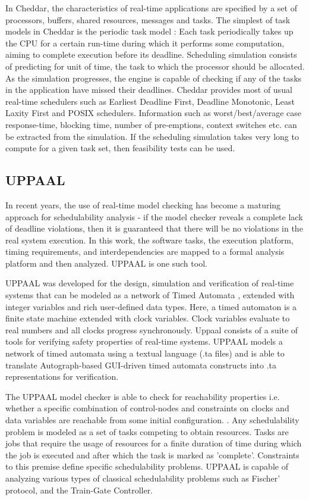 In Cheddar, the characteristics of real-time applications are specified by a set of processors, buffers, shared resources, messages and tasks. The simplest of task models in Cheddar is the periodic task model \cite{liu1973scheduling}: Each task periodically takes up the CPU for a certain run-time during which it performs some computation, aiming to complete execution before its deadline. Scheduling simulation consists of predicting for unit of time, the task to which the processor should be allocated. As the simulation progresses, the engine is capable of checking if any of the tasks in the application have missed their deadlines. Cheddar provides most of usual real-time schedulers such as Earliest Deadline First, Deadline Monotonic, Least Laxity First and POSIX schedulers. Information such as worst/best/average case response-time, blocking time, number of pre-emptions, context switches etc. can be extracted from the simulation. If the scheduling simulation takes very long to compute for a given task set, then feasibility tests can be used. 

\subsection{UPPAAL}

In recent years, the use of real-time model checking has become a maturing approach for schedulability analysis - if the model checker reveals a complete lack of deadline violations, then it is guaranteed that there will be no violations in the real system execution. In this work, the software tasks, the execution platform, timing requirements, and interdependencies are mapped to a formal analysis platform and then analyzed. UPPAAL \cite{larsen1997uppaal, bengtsson1996uppaal, david2009model} is one such tool. 

UPPAAL was developed for the design, simulation and verification of real-time systems that can be modeled as a network of Timed Automata \cite{Alur1994}, extended with integer variables and rich user-defined data types. Here, a timed automaton is a finite state machine extended with clock variables. Clock variables evaluate to real numbers and all clocks progress synchronously. Uppaal consists of a suite of tools for verifying safety properties of real-time systems. UPPAAL models a network of timed automata using a textual language (.ta files) and is able to translate Autograph-based GUI-driven timed automata constructs into .ta representations for verification.

The UPPAAL model checker is able to check for reachability properties i.e. whether a specific combination of control-nodes and constraints on clocks and data variables are reachable from some initial configuration. . Any schedulability problem is modeled as a set of tasks competing to obtain resources. Tasks are jobs that require the usage of resources for a finite duration of time during which the job is executed and after which the task is marked as 'complete'. Constraints to this premise define specific schedulability problems. UPPAAL is capable of analyzing various types of classical schedulability problems such as Fischer' protocol, and the Train-Gate Controller.

